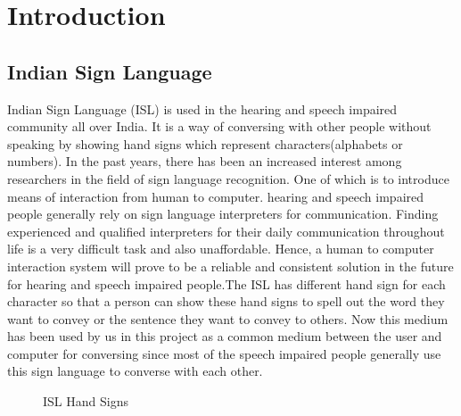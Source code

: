 \documentclass[12pt,a4paper]{report}
\begin{document}
\chapter{Introduction}

\section{Indian Sign Language}
Indian Sign Language (ISL) is used in the hearing and speech impaired community all over India. It is a way of conversing with other people without speaking by showing hand signs which represent characters(alphabets or numbers). In the past years, there has been an increased interest among researchers in the field of sign language recognition. One of which is to introduce means of interaction from human to computer. hearing and speech impaired people generally rely on sign language interpreters for communication. Finding experienced and qualified interpreters for their daily communication throughout life is a very difficult task and also unaffordable. Hence, a human to computer interaction system will prove to be a reliable and consistent solution in the future for hearing and speech impaired people.The ISL has different hand sign for each character so that a person can show these hand signs to spell out the word they want to convey or the sentence they want to convey to others. Now this medium has been used by us in this project as a common medium between the user and computer for conversing since most of the speech impaired people generally use this sign language to converse with each other.
\begin{figure}[htbp]
  \hfill
  \hfill
  \hfill
  \break
  \caption{ISL Hand Signs}
  \label{Isl}
\end{figure}
\end{document}
